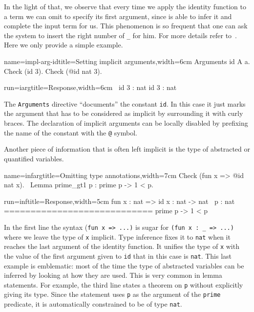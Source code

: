 In the light of that, we observe that every time we apply the identity
function to a term we can omit to specify its first argument,
since \Coq{} is able to infer it and complete the input term for us.
This phenomenon is so frequent that one can ask the system to insert
the right number of \lstinline/_/ for him.  For more details
refer to~\cite[section 2.7]{Coq:manual}.  Here
we only provide a simple example.

\begin{coq-left}{name=impl-arg-id}{title=Setting implicit arguments,width=6cm}
Arguments id {A} a.
Check (id 3).
Check (@id nat 3).
\end{coq-left}
\begin{coqout-right}{run=iarg}{title=Response,width=6cm}
$~$
id 3 : nat
id 3 : nat
\end{coqout-right}

The \lstinline/Arguments/ directive ``documents'' the constant
\lstinline/id/.  In this case it just marks the argument that has to
be considered as implicit by surrounding it with curly braces.
The declaration of implicit arguments can be locally disabled by
prefixing the name of the constant with the \lstinline/@/ symbol.

Another piece of information that is often left implicit is
the type of abstracted or quantified variables.

\begin{coq-left}{name=infarg}{title=Omitting type annotations,width=7cm}
Check (fun x => @id nat x).
$~$
Lemma prime_gt1 p :
  prime p -> 1 < p.
$~$
\end{coq-left}
\begin{coqout-right}{run=inf}{title=Response,width=5cm}
fun x : nat => id x : nat -> nat
$~$
p : nat
============================
 prime p -> 1 < p
\end{coqout-right}

In the first line the syntax (\lstinline/fun x => ...)/ is sugar for
\lstinline/(fun x : _ => ...)/ where we leave the type of
\lstinline/x/ implicit.  Type inference fixes it to \lstinline/nat/
when it reaches the last argument of the identity function.
It unifies the type of \lstinline/x/ with the value of the first
argument given to \lstinline/id/ that in this case is \lstinline/nat/.
This last example is emblematic: most of the time the type of
abstracted variables can be inferred by looking at how they are used.
This is very common in lemma statements.  For example, the third line
states a theorem on \lstinline/p/ without explicitly giving its type.
Since the statement uses \lstinline/p/ as the argument of the
\lstinline/prime/ predicate, it is automatically constrained to be
of type \lstinline/nat/.

